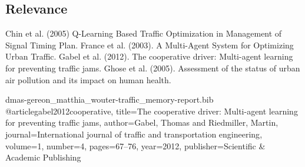 \documentclass[a4paper,hidelinks]{article}
\begin{document}
\subsection{Relevance}





\begin{thebibliography}{8}


 Chin et al. (2005) Q-Learning Based Traffic Optimization in Management of Signal Timing Plan.
 France et al. (2003). A Multi-Agent System for Optimizing Urban Traffic.
 Gabel et al. (2012). The cooperative driver: Multi-agent learning for preventing traffic jams.
 Ghose et al. (2005). Assessment of the status of urban air pollution and its impact on human health.

\end{thebibliography}

\begin{filecontents}{dmas-gereon_matthia_wouter-traffic_memory-report.bib}
@article{gabel2012cooperative,
  title={The cooperative driver: Multi-agent learning for preventing traffic jams},
  author={Gabel, Thomas and Riedmiller, Martin},
  journal={International journal of traffic and transportation engineering},
  volume={1},
  number={4},
  pages={67--76},
  year={2012},
  publisher={Scientific \& Academic Publishing}
}
\end{filecontents}
\end{document}
